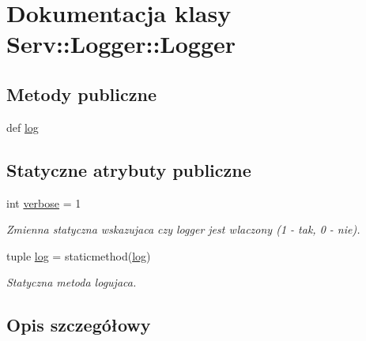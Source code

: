\hypertarget{class_serv_1_1_logger_1_1_logger}{
\section{Dokumentacja klasy Serv::Logger::Logger}
\label{class_serv_1_1_logger_1_1_logger}
}
\subsection*{Metody publiczne}
\begin{CompactItemize}
\item 
def \hyperlink{class_serv_1_1_logger_1_1_logger_03728c5f5817396e373bde7861b69d69}{log}
\end{CompactItemize}
\subsection*{Statyczne atrybuty publiczne}
\begin{CompactItemize}
\item 
\hypertarget{class_serv_1_1_logger_1_1_logger_22b9bdb8768d7f8b09bb8b3d44ee7e08}{
int \hyperlink{class_serv_1_1_logger_1_1_logger_22b9bdb8768d7f8b09bb8b3d44ee7e08}{verbose} = 1}
\label{class_serv_1_1_logger_1_1_logger_22b9bdb8768d7f8b09bb8b3d44ee7e08}

\begin{CompactList}\small\item\em Zmienna statyczna wskazujaca czy logger jest wlaczony (1 - tak, 0 - nie). \item\end{CompactList}\item 
\hypertarget{class_serv_1_1_logger_1_1_logger_39152ac6c2beb98a302c7fd6839427d6}{
tuple \hyperlink{class_serv_1_1_logger_1_1_logger_39152ac6c2beb98a302c7fd6839427d6}{log} = staticmethod(\hyperlink{class_serv_1_1_logger_1_1_logger_39152ac6c2beb98a302c7fd6839427d6}{log})}
\label{class_serv_1_1_logger_1_1_logger_39152ac6c2beb98a302c7fd6839427d6}

\begin{CompactList}\small\item\em Statyczna metoda logujaca. \item\end{CompactList}\end{CompactItemize}


\subsection{Opis szczegółowy}


